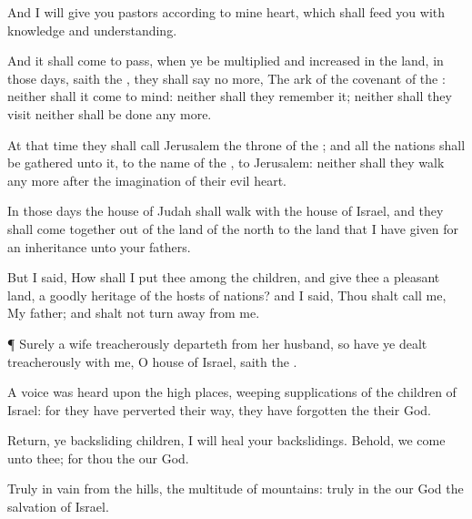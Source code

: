 {And I will
give you
pastors according to mine
heart, which shall
feed you with
knowledge and
understanding.

And it shall come to pass, when ye be
multiplied and
increased in the
land, in those
days,
saith the
{}, they shall
say no more, The
ark of the
covenant of the
{}: neither shall it
come to
mind: neither shall they
remember it; neither shall they
visit
{} neither shall
{} be
done any more.

At that
time they shall
call
Jerusalem the
throne of the
{}; and all the
nations shall be
gathered unto it, to the
name of the
{}, to
Jerusalem: neither shall they
walk any more
after the
imagination of their
evil
heart.

In those
days the
house of
Judah shall
walk with the
house of
Israel, and they shall
come
together out of the
land of the
north to the
land that I have given for an
inheritance unto your
fathers.

But I
said, How shall I
put thee among the
children, and
give thee a
pleasant
land, a
goodly
heritage of the
hosts of
nations? and I
said, Thou shalt
call me, My
father; and shalt not turn
away from
me.


\par }{\PP {}¶
Surely
{} a
wife
treacherously departeth from her
husband, so have ye dealt
treacherously with me, O
house of
Israel,
saith the
{}.

A
voice was
heard upon the high
places,
weeping
{}
supplications of the
children of
Israel: for they have
perverted their
way,
{} they have
forgotten the
{} their
God.

Return, ye
backsliding
children,
{} I will
heal your
backslidings. Behold, we
come unto thee; for thou
{} the
{} our
God.

Truly in
vain
{} from the
hills,
{} the
multitude of
mountains:
truly in the
{} our
God
{} the
salvation of
Israel.

}
